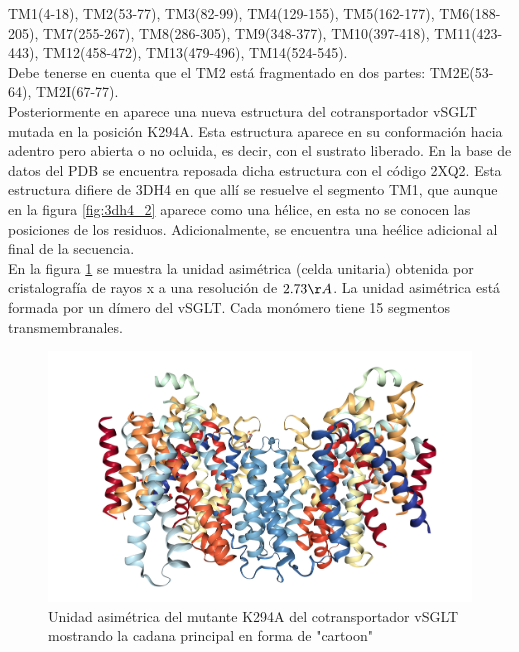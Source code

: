 TM1(4-18), TM2(53-77), TM3(82-99), TM4(129-155), TM5(162-177), TM6(188-205), TM7(255-267), TM8(286-305), TM9(348-377), TM10(397-418), TM11(423-443), TM12(458-472), TM13(479-496), TM14(524-545).\\

Debe tenerse en cuenta que el TM2 est\'{a} fragmentado en dos partes:  TM2E(53-64), TM2I(67-77).\\

Posteriormente en \cite{Watanabe2010} aparece una nueva estructura del cotransportador vSGLT mutada en la posici\'{o}n K294A. Esta estructura aparece en su conformaci\'{o}n hacia adentro pero abierta o no ocluida, es decir, con el sustrato liberado. En la base de datos del PDB se encuentra reposada dicha estructura con el c\'{o}digo 2XQ2. Esta estructura difiere de 3DH4 en que all\'{i} se resuelve el segmento TM1, que aunque en la figura \ref{fig:3dh4_2} aparece como una h\'{e}lice, en esta no se conocen las posiciones de los residuos. Adicionalmente, se encuentra una he\'{e}lice adicional al final de la secuencia.\\

En la figura \ref{fig:2xq2} se muestra la unidad asim\'{e}trica (celda unitaria) obtenida por cristalograf\'{i}a de rayos x a una resoluci\'{o}n de $2.73\AA$. La unidad asim\'{e}trica est\'{a} formada por un d\'{i}mero del vSGLT. Cada mon\'{o}mero tiene 15 segmentos transmembranales.\\
\begin{figure}[H]
\centering
\includegraphics[scale=0.2]{Kap3/2xq2.png}
\caption{Unidad asim\'{e}trica del mutante K294A del cotransportador vSGLT mostrando la cadana principal en forma de "cartoon" }\label{fig:2xq2}
\end{figure}
